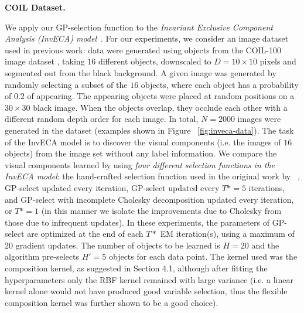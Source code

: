 \documentclass[12pt]{article}
\begin{document}
\textbf{COIL Dataset.}
%
\begin{figure*}[t!]
\texttt{[image: \{NECO-07-16-2662R2-Figure.4]}.eps}
\caption{COIL Dataset \citep{coil100}: 
A handful of data points used in experiments with the Translation Invariant Occlusive (InvECA) model, showing the occluding objects to be learned. }
\label{fig:inveca-data}
\end{figure*}
%
We apply our GP-selection function to the \emph{Invariant Exclusive Component Analysis (InvECA) model}~\citep{DaiLucke2012b,DaiEtAl2013}.
For our experiments, we consider an image dataset used in previous work: data were generated using objects from the COIL-100 image dataset \citep{coil100}, taking $16$ different objects, downscaled to $D=10 \times 10$ pixels and segmented out from the black background.
A given image was generated by randomly selecting a subset of the $16$ objects, where each object has a probability of $0.2$ of appearing.
The appearing objects were placed at random positions on a $30 \times 30$ black image.
When the objects overlap, they occlude each other with a different random depth order for each image.
In total, $N=2000$ images were generated in the dataset (examples shown in Figure~ \ref{fig:inveca-data}).
The task of the InvECA model is to discover the visual components (i.e. the images of $16$ objects) from the image set without any label information. 
We compare the visual components learned by using \emph{four different selection functions in the InvECA model}: the hand-crafted selection function used in the original work by ~\citet{DaiLucke2012b}, GP-select updated every iteration, GP-select updated every $T*=5$ iterations, and GP-select with incomplete Cholesky decomposition updated every iteration, or $T\ast=1$ (in this manner we isolate the improvements due to Cholesky from those due to infrequent updates). 
In these experiments, the parameters of GP-select are optimized at the end of each $T*$ EM iteration(s), using a maximum of $20$ gradient updates.
The number of objects to be learned is $H=20$ and the algorithm pre-selects $H'=5$ objects for each data point.
The kernel used was the composition kernel, as suggested in Section 4.1, although after fitting the hyperparameters only the RBF kernel remained with large variance (i.e. a linear kernel alone would not have produced good variable selection, thus the flexible composition kernel was further shown to be a good choice).
\end{document}
